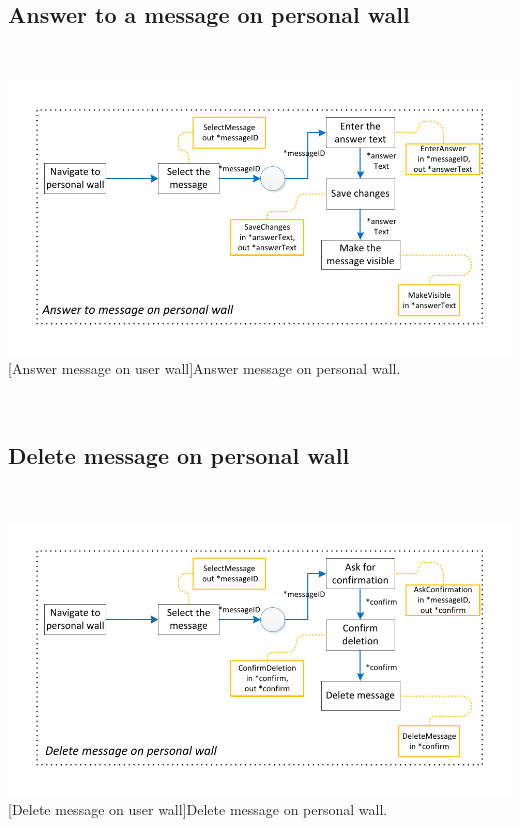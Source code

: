 \documentclass[11pt, a4paper,svglistings,oneside]{book}
\begin{document}
\subsection{Answer to a message on personal wall}

$\;$ \\
\noindent\begin{minipage}{\textwidth}
    \centering
   \includegraphics[scale=1]{nav_AnswerMessagePersonalWall.pdf}
 [Answer message on user wall]{Answer message on personal wall.}
\end{minipage}
$\;$ \\ 

\subsection{Delete message on personal wall}

$\;$ \\
\noindent\begin{minipage}{\textwidth}
    \centering
   \includegraphics[scale=1]{nav_DeleteMessageOnWall.pdf}
 [Delete message on user wall]{Delete message on personal wall.}
\end{minipage}
$\;$ \\ 
\end{document}
